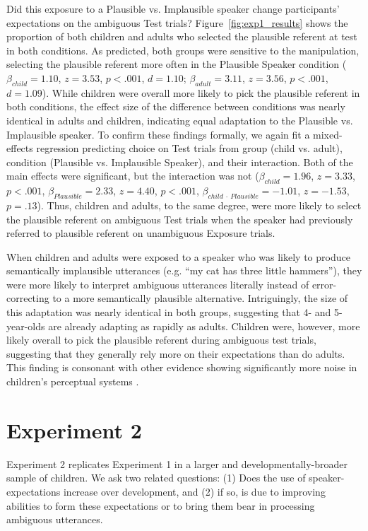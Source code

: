 \documentclass[man,floatsintext]{apa6}
\begin{document}
Did this exposure to a Plausible vs. Implausible speaker change participants' expectations on the ambiguous Test trials? Figure~\ref{fig:exp1_results} shows the proportion of both children and adults who selected the plausible referent at test in both conditions. As predicted, both groups were sensitive to the manipulation, selecting the plausible referent more often in the Plausible Speaker condition ($\beta_{child} = 1.10$, $z = 3.53$, $p <.001$, $d = 1.10$; $\beta_{adult} = 3.11$, $z = 3.56$, $p <.001$, $d = 1.09$). While children were overall more likely to pick the plausible referent in both conditions, the effect size of the difference between conditions was nearly identical in adults and children, indicating equal adaptation to the Plausible vs. Implausible speaker. To confirm these findings formally, we again fit a mixed-effects regression predicting choice on Test trials from group (child vs. adult), condition (Plausible vs. Implausible Speaker), and their interaction. Both of the main effects were significant, but the interaction was not ($\beta_{child} = 1.96$,  $z = 3.33$, $p <.001$, $\beta_{Plausible} = 2.33$,  $z = 4.40$, $p <.001$,  $\beta_{child \: \cdot \: Plausible} = -1.01$,  $z = -1.53$, $p = .13$). Thus, children and adults, to the same degree, were more likely to select the plausible referent on ambiguous Test trials when the speaker had previously referred to plausible referent on unambiguous Exposure trials.

When children and adults were exposed to a speaker who was likely to produce semantically implausible utterances (e.g. ``my cat has three little hammers''), they were more likely to interpret ambiguous utterances literally instead of error-correcting to a more semantically plausible alternative. Intriguingly, the size of this adaptation was nearly identical in both groups, suggesting that 4- and 5-year-olds are already adapting as rapidly as adults. Children were, however, more likely overall to pick the plausible referent during ambiguous test trials, suggesting that they generally rely more on their expectations than do adults. This finding is consonant with other evidence showing significantly more noise in children's perceptual systems \cite{neuman1983}.

\section{Experiment 2}

Experiment 2 replicates Experiment 1 in a larger and developmentally-broader sample of children. We ask two related questions: (1) Does the use of speaker-expectations increase over development, and (2) if so, is due to improving abilities to form these expectations or to bring them bear in processing ambiguous utterances.  
\end{document}
